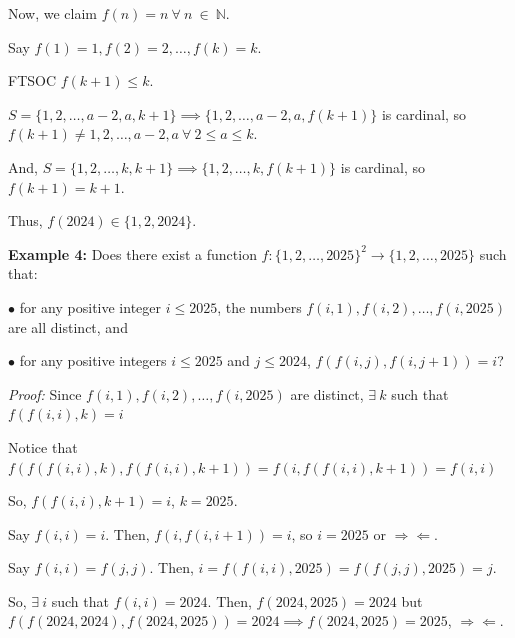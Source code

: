 \documentclass[10pt,letterpaper]{article}
\begin{document}
Now, we claim $f(n)=n \ \forall \ n \ \in \ \mathbb{N}$.

Say $f(1)=1, f(2)=2, \dots, f(k)=k$.

FTSOC $f(k+1)\le k$.

$S=\{1,2,\dots,a-2,a,k+1\}\implies \{1,2,\dots,a-2,a,f(k+1)\}$ is cardinal, so $f(k+1)\neq 1,2,\dots,a-2,a \ \forall \ 2 \le a \le k$.

And, $S=\{1,2,\dots,k,k+1\}\implies \{1,2,\dots,k,f(k+1)\}$ is cardinal, so $f(k+1)=k+1$.

Thus, $\boxed{f(2024)\in \{1,2,2024\}}$.
\par{}
\par

\par\vspace{12pt}
\begin{tcolorbox}[breakable,title={India IMOTC 2025, Day 4, P2},colbacktitle=black!4,coltitle=black,fonttitle=\normalfont]
\textbf{Example 4:} Does there exist a function $f:\{1,2,\dots,2025\}^2 \rightarrow \{1,2,\dots,2025\}$ such that:

$\bullet$ for any positive integer $i \leqslant 2025$, the numbers $f(i,1),f(i,2),\dots,f(i,2025)$ are all distinct, and

$\bullet$ for any positive integers $i \leqslant 2025$ and $j \leqslant 2024$, $f(f(i,j),f(i,j+1))=i$?
\end{tcolorbox}
\textit{Proof:}
Since $f(i,1),f(i,2),\dots ,f(i,2025)$ are distinct, $\exists \ k$ such that $f(f(i,i),k)=i$

Notice that $f(f(f(i,i),k),f(f(i,i),k+1))=f(i,f(f(i,i),k+1))=f(i,i)$

So, $f(f(i,i),k+1)=i$, $k=2025$.

Say $f(i,i)=i$. Then, $f(i,f(i,i+1))=i$, so $i=2025$ or $\Rightarrow\Leftarrow$.

Say $f(i,i)=f(j,j)$. Then, $i=f(f(i,i),2025)=f(f(j,j),2025)=j$.

So, $\exists \ i$ such that $f(i,i)=2024$. Then, $f(2024,2025)=2024$ but $f(f(2024,2024),f(2024,2025))=2024\implies f(2024,2025)=2025$, $\Rightarrow \Leftarrow$.
\par{}
\par
\end{document}
